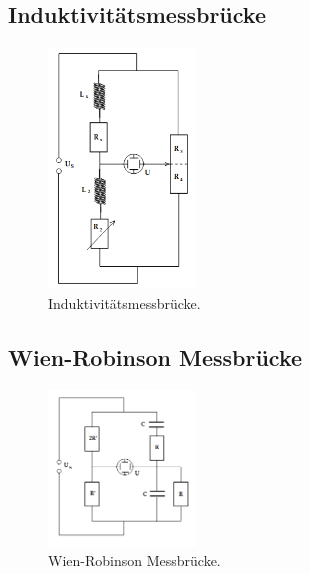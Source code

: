 \subsection{Induktivitätsmessbrücke}
\begin{figure}[H]
    \centering
        \centering
        \includegraphics[width=0.35\textwidth]{Bilder/induktivitaetsmess.png}
        \caption{Induktivitätsmessbrücke. \cite{anleitung}}
    \hfill
    \label{fig:f4}
\end{figure}

\subsection{Wien-Robinson Messbrücke}
\begin{figure}[H]
    \centering
        \centering
        \includegraphics[width=0.35\textwidth]{Bilder/wien_robinson.png}
        \caption{Wien-Robinson Messbrücke. \cite{anleitung}}
    \hfill
    \label{fig:f5}
\end{figure}
